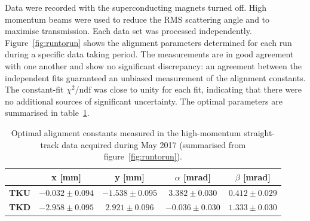 Data were recorded with the superconducting magnets turned off.
High momentum beams were used to reduce the RMS scattering angle and
to maximise transmission.   
Each data set was processed independently.
Figure~\ref{fig:runtorun} shows the alignment parameters determined for
each run during a specific data taking period.
The measurements are in good agreement with one another and show no
significant discrepancy: an agreement between the independent fits
guaranteed an unbiased measurement of the alignment constants.
The constant-fit $\chi^2/\text{ndf}$ was close to unity for each fit,
indicating that there were no additional sources of significant
uncertainty.
The optimal parameters are summarised in
table~\ref{tab:201701_constants}. 
\begin{table}
  \caption{
    Optimal alignment constants measured in the high-momentum straight-track data
    acquired during May 2017 (summarised from figure~\ref{fig:runtorun}).
    }
    \begin{center}
    \begin{tabular}{|l|c|c|c|c|}
  \hline
	& \textbf{x [mm]} & \textbf{y [mm]} & \textbf{$\alpha$ [mrad]} & \textbf{$\beta$ [mrad]} \\
	\hline
	\textbf{TKU} & $-0.032\pm0.094$ & $-1.538\pm0.095$ & $ 3.382\pm0.030$ & $0.412\pm0.029$ \\
	\textbf{TKD} & $-2.958\pm0.095$ & $ 2.921\pm0.096$ & $-0.036\pm0.030$ & $1.333\pm0.030$ \\
	\hline
    \end{tabular}
  \end{center}
  \label{tab:201701_constants}
\end{table}
